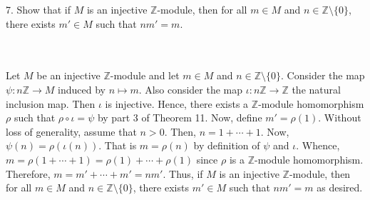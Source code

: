 7. Show that if $M$ is an injective $\mathbb{Z}$-module, then for all $m\in M$ and
$n\in\mathbb{Z}\setminus\{0\}$, there exists $m'\in M$ such that $nm'=m$.\\\\

\begin{solution}\renewcommand{\qedsymbol}{}\ \\
    Let $M$ be an injective $\mathbb{Z}$-module and let $m\in M$ and $n\in\mathbb{Z}\setminus\{0\}$.
    Consider the map $\psi:n\mathbb{Z}\rightarrow M$ induced by $n\mapsto m$. Also consider the map
    $\iota:n\mathbb{Z}\rightarrow\mathbb{Z}$ the natural inclusion map. Then $\iota$ is injective.
    Hence, there exists a $\mathbb{Z}$-module homomorphism $\rho$ such that $\rho\circ\iota=\psi$ by
    part 3 of Theorem 11. Now, define $m'=\rho(1)$. Without loss of generality, assume that $n>0$. Then,
    $n=1+\cdots+1$. Now, $\psi(n)=\rho(\iota(n))$. That is $m=\rho(n)$ by definition of $\psi$ and
    $\iota$. Whence, $m=\rho(1+\cdots+1)=\rho(1)+\cdots+\rho(1)$ since $\rho$ is a $\mathbb{Z}$-module
    homomorphism. Therefore, $m=m'+\cdots+m'=nm'$. Thus, if $M$ is an injective $\mathbb{Z}$-module,
    then for all $m\in M$ and $n\in\mathbb{Z}\setminus\{0\}$, there exists $m'\in M$ such that $nm'=m$
    as desired.

\end{solution}